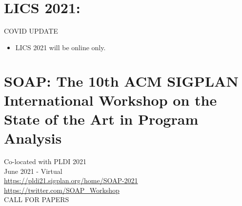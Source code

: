 \documentclass{article}
\begin{document}
\section{LICS 2021:}\label{LICS2021}COVID UPDATE 

\begin{itemize}\item  LICS 2021 will be online only. 
 
\end{itemize}\section{SOAP: The 10th ACM SIGPLAN International Workshop on the State of the Art in Program Analysis }\label{SOAP}  Co-located with PLDI 2021\\ 
  June 2021 - Virtual\\ 
  \href{https://pldi21.sigplan.org/home/SOAP-2021}{https://pldi21.sigplan.org/home/SOAP-2021}\\ 
  \href{https://twitter.com/SOAP_Workshop}{https://twitter.com/SOAP\_Workshop}\\ 
CALL FOR PAPERS 
\end{document}
